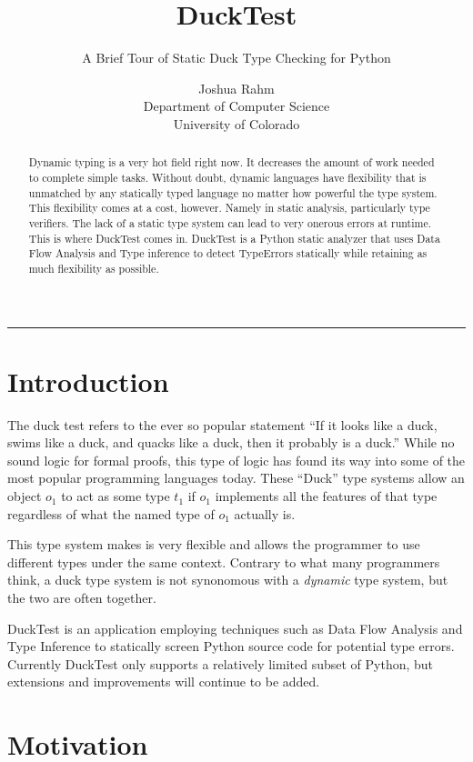 \documentclass{scrartcl}
\title{DuckTest}
\subtitle{{\textcolor{bardark}{A Brief Tour of Static Duck Type Checking for Python}}}
\author{Joshua Rahm \\
\footnotesize Department of Computer Science \\[2pt]
\footnotesize University of Colorado}
\date{}
\begin{document}
\nocite{*}
\maketitle
\hrule

\begin{multicols}{2}

\begin{abstract}
    Dynamic typing is a very hot field right now. It decreases the amount
    of work needed to complete simple tasks. Without doubt, dynamic languages
    have flexibility that is unmatched by any statically typed language no
    matter how powerful the type system. This flexibility comes at a cost, however.
    Namely in static analysis, particularly type verifiers. The lack of a static
    type system can lead to very onerous errors at runtime. This is where DuckTest
    comes in. DuckTest is a Python static analyzer that uses Data Flow Analysis
    and Type inference to detect TypeErrors statically while retaining as
    much flexibility as possible.
\end{abstract}

\section*{Introduction}

The duck test refers to the ever so popular statement ``If it looks like a duck,
swims like a duck, and quacks like a duck, then it probably is a duck.'' While
no sound logic for formal proofs, this type of logic has found its way into some
of the most popular programming languages today. These ``Duck'' type systems allow
an object $o_1$ to act as some type $t_1$ if $o_1$ implements all the features of
that type regardless of what the named type of $o_1$ actually is.

This type system makes is very flexible and allows the programmer to use
different types under the same context. Contrary to what many programmers
think, a duck type system is not synonomous with a \emph{dynamic} type
system, but the two are often together.

DuckTest is an application employing techniques such as Data Flow Analysis and
Type Inference to statically screen Python source code for potential type errors.
Currently DuckTest only supports a relatively limited subset of Python, but
extensions and improvements will continue to be added.

\section*{Motivation}


\end{multicols}
\end{document}
